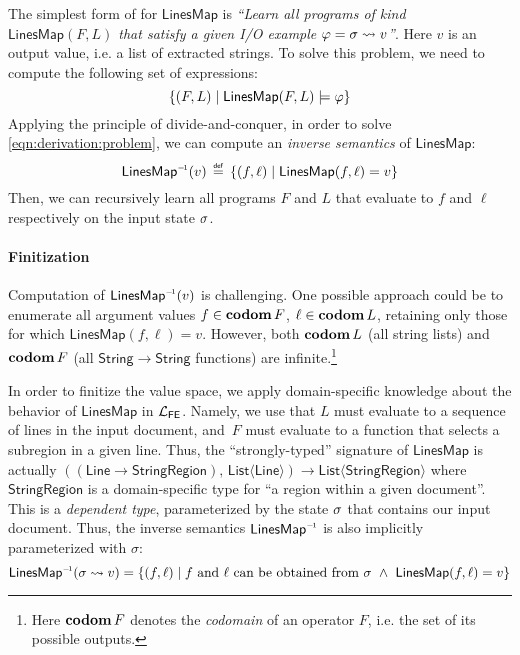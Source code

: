 The simplest form of  for $\mathsf{LinesMap}$ is \emph{``Learn all programs of kind
    $\mathsf{LinesMap}(F, L)$ that satisfy a given I/O example $\varphi = \sigma \rightsquigarrow v$''}.
Here $v$ is an output value, i.e. a list of extracted strings.
To solve this problem, we need to compute the following set of expressions:
\begin{equation}
    \left\{\left(F, L\right) \mid \mathsf{LinesMap}(F, L) \models \varphi \right\}
    \label{eqn:derivation:problem}
\end{equation}
Applying the principle of divide-and-conquer, in order to solve \eqref{eqn:derivation:problem}, we can compute an
\emph{inverse semantics} of $\mathsf{LinesMap}$:
\begin{equation}
    \mathsf{LinesMap}^{{\scriptscriptstyle-\!1}}(v) \,\mathrel{\overset{\mathsf{\scriptscriptstyle def}}{=}}\, \left\{(f, \ell) \mid \mathsf{LinesMap}(f, \ell) = v\right\}
    \label{eqn:derivation:inverse}
\end{equation}
Then, we can recursively learn all programs $F$ and $L$ that evaluate to $f$ and $\ell$ respectively on the input state
$\sigma$.

\paragraph{Finitization}
Computation of $\mathsf{LinesMap}^{{\scriptscriptstyle-\!1}}(v)$ is challenging.
One possible approach could be to enumerate all argument values $f \in \operatorname*{\textbf{codom}} F$, $\ell \in \operatorname*{\textbf{codom}} L$, retaining
only those for which $\mathsf{LinesMap}(f, \ell) = v$.
However, both $\operatorname*{\textbf{codom}} L$ (all string lists) and $\operatorname*{\textbf{codom}} F$ (all $\mathsf{String} \to \mathsf{String}$ functions)
are infinite.\footnote{%
    Here $\operatorname*{\textbf{codom}} F$ denotes the \emph{codomain} of an operator $F$, i.e. the set of its possible outputs.
}

In order to finitize the value space, we apply domain-specific knowledge about the behavior of $\mathsf{LinesMap}$ in
$\mathcal{L}_{\mathsf{FE}}$.
Namely, we use that $L$ must evaluate to a sequence of lines in the input document, and~$F$ must evaluate to a function
that selects a subregion in a given line.
Thus, the ``strongly-typed'' signature of $\mathsf{LinesMap}$ is actually $((\mathsf{Line} \!\to\!
\mathsf{StringRegion}),\,
\mathsf{List}\langle \mathsf{Line}\rangle) \to \mathsf{List}\langle \mathsf{StringRegion}\rangle$
where $\mathsf{StringRegion}$ is a domain-specific type for ``a region within a given document''.
This is a \emph{dependent type}, parameterized by the state $\sigma$ that contains our input document.
Thus, the inverse semantics $\mathsf{LinesMap}^{{\scriptscriptstyle-\!1}}$ is also implicitly parameterized with $\sigma$:
\begin{equation*}
    \mathsf{LinesMap}^{\inv}(\state \rightsquigarrow v) =
    \left\{(f, \ell) \mid
        f \text{ and } \ell \text{ can be obtained from } \state \ \wedge\ \mathsf{LinesMap}(f, \ell) = v
    \right\}
\end{equation*}

